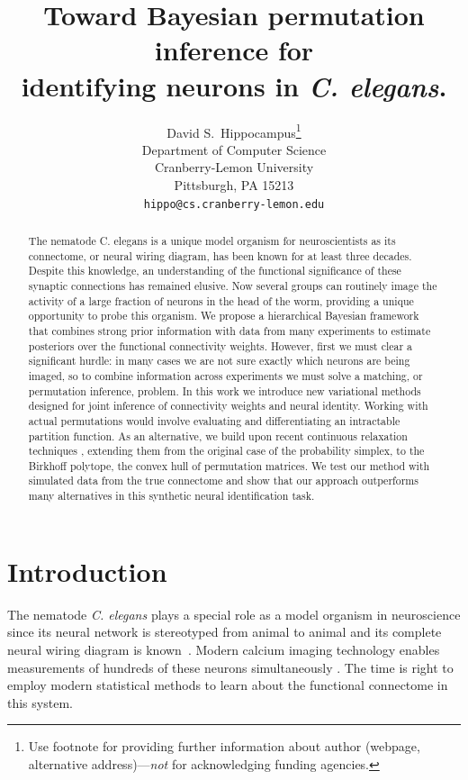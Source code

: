 \documentclass{article}
\title{Toward Bayesian permutation inference for \\identifying neurons in \textit{C. elegans}.}
\author{
  David S.~Hippocampus\thanks{Use footnote for providing further
    information about author (webpage, alternative
    address)---\emph{not} for acknowledging funding agencies.} \\
  Department of Computer Science\\
  Cranberry-Lemon University\\
  Pittsburgh, PA 15213 \\
  \texttt{hippo@cs.cranberry-lemon.edu} \\
}
\begin{document}

\maketitle

\begin{abstract}
  The nematode C. elegans is a unique model organism for
  neuroscientists as its connectome, or neural wiring diagram, has
  been known for at least three decades. Despite this knowledge, an
  understanding of the functional significance of these synaptic
  connections has remained elusive. Now several groups can routinely
  image the activity of a large fraction of neurons in the head of the
  worm, providing a unique opportunity to probe this organism. We
  propose a hierarchical Bayesian framework that combines strong prior
  information with data from many experiments to estimate posteriors
  over the functional connectivity weights. However, first we must
  clear a significant hurdle: in many cases we are not sure
  exactly which neurons are being imaged, so to combine information
  across experiments we must solve a matching, or permutation
  inference, problem. In this work we introduce new variational
  methods designed for joint inference of connectivity weights and
  neural identity. Working with actual permutations would involve
  evaluating and differentiating an intractable partition function. As
  an alternative, we build upon recent continuous relaxation
  techniques \citep{Jang2016, Maddison2016}, extending them from the
  original case of the probability simplex, to the Birkhoff polytope,
  the convex hull of permutation matrices. We test our method with
  simulated data from the true connectome and show that our approach
  outperforms many alternatives in this synthetic neural identification task.
\end{abstract}



\section{Introduction}
The nematode \textit{C. elegans} plays a special role as a model
organism in neuroscience since its neural network is stereotyped from
animal to animal and its complete neural wiring diagram is
known~\citep{varshney2011structural}.  Modern calcium imaging
technology enables measurements of hundreds of these neurons
simultaneously \citep{Kato2015, nguyen2016whole}. The time is
right to employ modern statistical methods to learn about the
functional connectome in this system.
\end{document}

